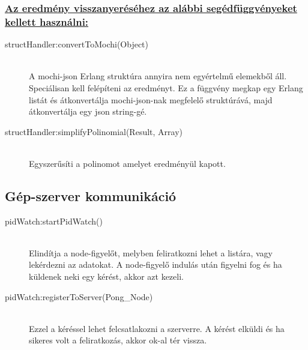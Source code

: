 	\subsubsection{\underline{Az eredmény visszanyeréséhez az alábbi segédfüggvényeket kellett használni:}}
	\begin{description}
	
		\item[structHandler:convertToMochi(Object)] \hfill \\ 
		A mochi-json Erlang struktúra annyira nem egyértelmű elemekből áll. Speciálisan kell felépíteni az eredményt. Ez a függvény megkap egy Erlang listát és átkonvertálja mochi-json-nak megfelelő struktúrává, majd átkonvertálja egy json string-gé.

		\item[structHandler:simplifyPolinomial(Result, Array) ] \hfill \\ 
		Egyszerűsíti a polinomot amelyet eredményül kapott.
	
	\end{description}
\subsection{Gép-szerver kommunikáció}
	\begin{description}
	\item[pidWatch:startPidWatch()]
	\hfill \\ Elindítja a node-figyelőt, melyben feliratkozni lehet a listára, vagy lekérdezni az adatokat. A node-figyelő indulás után figyelni fog és ha küldenek neki egy kérést, akkor azt kezeli. 
	\item[pidWatch:registerToServer(Pong\_Node)]
	\hfill \\ Ezzel a kéréssel lehet felcsatlakozni a szerverre. A kérést elküldi és ha sikeres volt a feliratkozás, akkor ok-al tér vissza.
	\end{description}
